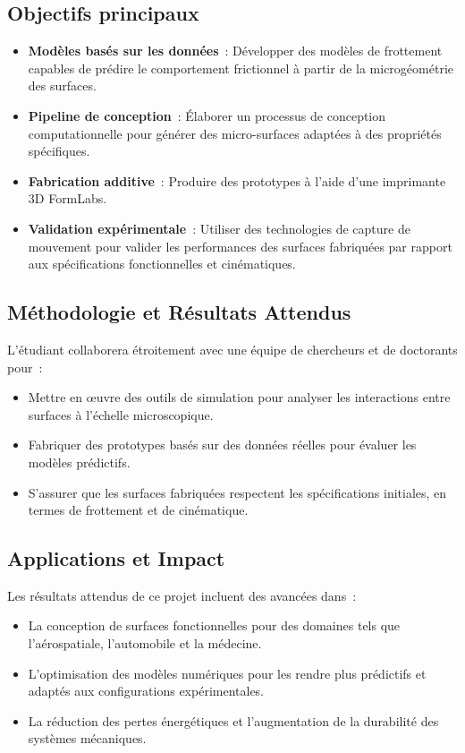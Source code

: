 \subsection*{Objectifs principaux}
\begin{itemize}
    \item \textbf{Modèles basés sur les données} : Développer des modèles de frottement capables de prédire le comportement frictionnel à partir de la microgéométrie des surfaces.
    \item \textbf{Pipeline de conception} : Élaborer un processus de conception computationnelle pour générer des micro-surfaces adaptées à des propriétés spécifiques.
    \item \textbf{Fabrication additive} : Produire des prototypes à l’aide d’une imprimante 3D FormLabs.
    \item \textbf{Validation expérimentale} : Utiliser des technologies de capture de mouvement pour valider les performances des surfaces fabriquées par rapport aux spécifications fonctionnelles et cinématiques.
\end{itemize}

\subsection*{Méthodologie et Résultats Attendus}

L’étudiant collaborera étroitement avec une équipe de chercheurs et de doctorants pour :
\begin{itemize}
    \item Mettre en œuvre des outils de simulation pour analyser les interactions entre surfaces à l’échelle microscopique.
    \item Fabriquer des prototypes basés sur des données réelles pour évaluer les modèles prédictifs.
    \item S’assurer que les surfaces fabriquées respectent les spécifications initiales, en termes de frottement et de cinématique.
\end{itemize}

\subsection*{Applications et Impact}

Les résultats attendus de ce projet incluent des avancées dans :
\begin{itemize}
    \item La conception de surfaces fonctionnelles pour des domaines tels que l’aérospatiale, l’automobile et la médecine.
    \item L’optimisation des modèles numériques pour les rendre plus prédictifs et adaptés aux configurations expérimentales.
    \item La réduction des pertes énergétiques et l’augmentation de la durabilité des systèmes mécaniques.
\end{itemize}